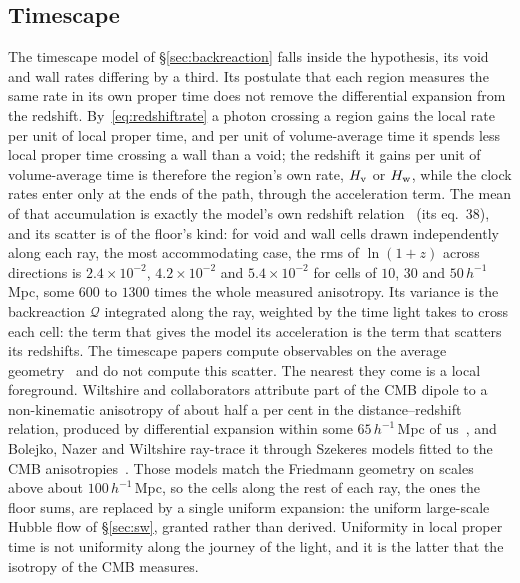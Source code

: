 \documentclass[11pt,a4paper]{article}
\begin{document}
\subsection{Timescape}\label{sec:timescape}

The timescape model of \S\ref{sec:backreaction} falls inside the hypothesis, its void and wall rates differing by a third. Its postulate that each region measures the same rate in its own proper time does not remove the differential expansion from the redshift. By~\eqref{eq:redshiftrate} a photon crossing a region gains the local rate per unit of local proper time, and per unit of volume-average time it spends less local proper time crossing a wall than a void; the redshift it gains per unit of volume-average time is therefore the region's own rate, $H_{\rm v}$ or $H_{\rm w}$, while the clock rates enter only at the ends of the path, through the acceleration term. The mean of that accumulation is exactly the model's own redshift relation~\cite{Wiltshire2009} (its eq.~38), and its scatter is of the floor's kind: for void and wall cells drawn independently along each ray, the most accommodating case, the rms of $\ln(1+z)$ across directions is $2.4\times10^{-2}$, $4.2\times10^{-2}$ and $5.4\times10^{-2}$ for cells of $10$, $30$ and $50\,h^{-1}$\,Mpc, some $600$ to $1300$ times the whole measured anisotropy. Its variance is the backreaction $\mathcal{Q}$ integrated along the ray, weighted by the time light takes to cross each cell: the term that gives the model its acceleration is the term that scatters its redshifts. The timescape papers compute observables on the average geometry~\cite{Wiltshire2009, NazerWiltshire2015, Seifert2025} and do not compute this scatter. The nearest they come is a local foreground. Wiltshire and collaborators attribute part of the CMB dipole to a non-kinematic anisotropy of about half a per cent in the distance--redshift relation, produced by differential expansion within some $65\,h^{-1}$\,Mpc of us~\cite{Wiltshire2013}, and Bolejko, Nazer and Wiltshire ray-trace it through Szekeres models fitted to the CMB anisotropies~\cite{Bolejko2016}. Those models match the Friedmann geometry on scales above about $100\,h^{-1}$\,Mpc, so the cells along the rest of each ray, the ones the floor sums, are replaced by a single uniform expansion: the uniform large-scale Hubble flow of \S\ref{sec:sw}, granted rather than derived. Uniformity in local proper time is not uniformity along the journey of the light, and it is the latter that the isotropy of the CMB measures.
\end{document}
